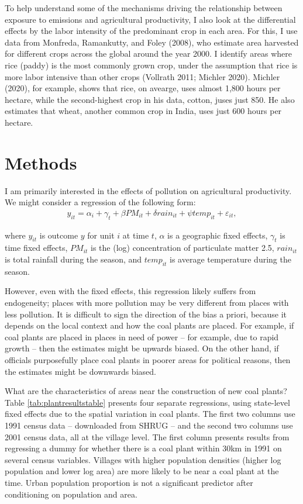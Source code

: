 \documentclass[
]{article}
\begin{document}
To help understand some of the mechanisms driving the relationship between exposure to emissions and agricultural productivity, I also look at the differential effects by the labor intensity of the predominant crop in each area. For this, I use data from Monfreda, Ramankutty, and Foley (2008), who estimate area harvested for different crops across the global around the year 2000. I identify areas where rice (paddy) is the most commonly grown crop, under the assumption that rice is more labor intensive than other crops (Vollrath 2011; Michler 2020). Michler (2020), for example, shows that rice, on avearge, uses almost 1,800 hours per hectare, while the second-highest crop in his data, cotton, juses just 850. He also estimates that wheat, another common crop in India, uses just 600 hours per hectare.

\hypertarget{methods}{%
\section{Methods}\label{methods}}

\label{identification}

I am primarily interested in the effects of pollution on agricultural productivity. We might consider a regression of the following form:
\begin{gather} y_{it} = \alpha_{i} + \gamma_{t} + \beta PM_{it} + \delta rain_{it} + \psi temp_{it} + \varepsilon_{it}, \end{gather}

where \(y_{it}\) is outcome \(y\) for unit \(i\) at time \(t\), \(\alpha\) is a geographic fixed effects, \(\gamma_t\) is time fixed effects, \(PM_{it}\) is the (log) concentration of particulate matter 2.5, \(rain_{it}\) is total rainfall during the season, and \(temp_{it}\) is average temperature during the season.

However, even with the fixed effects, this regression likely suffers from endogeneity; places with more pollution may be very different from places with less pollution. It is difficult to sign the direction of the bias a priori, because it depends on the local context and how the coal plants are placed. For example, if coal plants are placed in places in need of power -- for example, due to rapid growth -- then the estimates might be upwards biased. On the other hand, if officials purposefully place coal plants in poorer areas for political reasons, then the estimates might be downwards biased.

What are the characteristics of areas near the construction of new coal plants? Table \ref{tab:plantresultstable} presents four separate regressions, using state-level fixed effects due to the spatial variation in coal plants. The first two columns use 1991 census data -- downloaded from SHRUG -- and the second two columns use 2001 census data, all at the village level. The first column presents results from regressing a dummy for whether there is a coal plant within 30km in 1991 on several census variables. Villages with higher population densities (higher log population and lower log area) are more likely to be near a coal plant at the time. Urban population proportion is not a significant predictor after conditioning on population and area.
\end{document}
